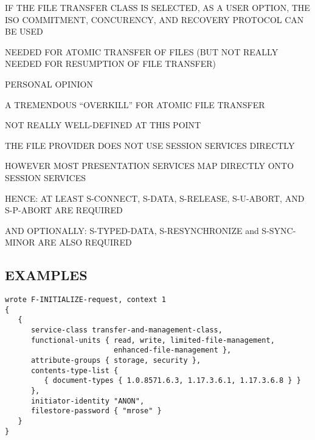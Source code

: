 \begin{bwslide}

\begin{nrtc}
\item	IF THE FILE TRANSFER CLASS IS SELECTED, AS A USER OPTION,
	THE ISO COMMITMENT, CONCURENCY, AND RECOVERY PROTOCOL CAN BE USED

\item	NEEDED FOR ATOMIC TRANSFER OF FILES (BUT NOT REALLY NEEDED FOR
	RESUMPTION OF FILE TRANSFER)

\item	PERSONAL OPINION
    \begin{nrtc}
    \item	A TREMENDOUS ``OVERKILL'' FOR ATOMIC FILE TRANSFER

    \item	NOT REALLY WELL-DEFINED AT THIS POINT
    \end{nrtc}
\end{nrtc}
\end{bwslide}


\begin{bwslide}

\begin{nrtc}
\item	THE FILE PROVIDER DOES NOT USE SESSION SERVICES DIRECTLY

\item	HOWEVER MOST PRESENTATION SERVICES MAP DIRECTLY ONTO SESSION SERVICES

\item	HENCE: AT LEAST S-CONNECT, S-DATA, S-RELEASE, S-U-ABORT, AND S-P-ABORT
	ARE REQUIRED

\item	AND OPTIONALLY: S-TYPED-DATA, S-RESYNCHRONIZE and S-SYNC-MINOR ARE
	ALSO REQUIRED
\end{nrtc}
\end{bwslide}


\begin{bwslide}
\part*	{EXAMPLES}\small

\begin{verbatim}
wrote F-INITIALIZE-request, context 1
{
   {
      service-class transfer-and-management-class,
      functional-units { read, write, limited-file-management,
                         enhanced-file-management },
      attribute-groups { storage, security },
      contents-type-list {
         { document-types { 1.0.8571.6.3, 1.17.3.6.1, 1.17.3.6.8 } }
      },
      initiator-identity "ANON",
      filestore-password { "mrose" }
   }
}
\end{verbatim}
\end{bwslide}


